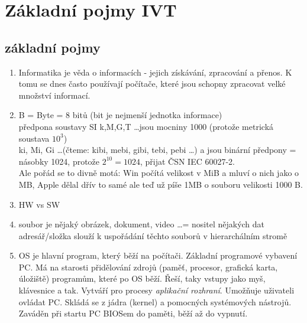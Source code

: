 \documentclass[12pt]{article}
\begin{document}
\section{Základní pojmy IVT}
\subsection{základní pojmy}
\begin{enumerate}
\item Informatika je věda o informacích - jejich získávání, zpracování a přenos. K tomu se dnes často používají počítače, které jsou schopny zpracovat velké množství informací.
\item B = Byte = 8 bitů (bit je nejmenší jednotka informace)\\
předpona soustavy SI k,M,G,T \dots jsou mocniny 1000 (protože metrická soustava $10^3$)\\
ki, Mi, Gi \dots (čteme: kibi, mebi, gibi, tebi, pebi \dots) a jsou binární předpony = násobky 1024, protože $2^10 = 1024$, přijat ČSN IEC 60027-2.\\
Ale pořád se to divně motá: Win počítá velikost v MiB a mluví o nich jako o MB, Apple dělal dřív to samé ale teď už píše 1MB o souboru velikosti 1000 B. 
\item HW vs SW
\item soubor je nějaký obrázek, dokument, video \dots  = nositel nějakých dat\\
adresář/složka slouží k uspořádání těchto souborů v hierarchálním stromě
\item OS je hlavní program, který běží na počítači. Základní programové vybavení PC. Má na starosti přidělování zdrojů (paměť, procesor, grafická karta, úložiště) programům, které po OS běží. Řeší, taky vstupy jako myš, klávesnice a tak. Vytváří pro procesy \emph{aplikační rozhraní}. Umožňuje uživateli ovládat PC. Skládá se z jádra (kernel) a pomocných systémových nástrojů. Zaváděn při startu PC BIOSem do paměti, běží až do vypnutí.
\end{enumerate}
\end{document}
